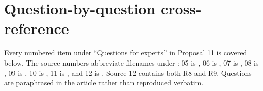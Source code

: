 \section{Question-by-question cross-reference}\label{app:crosswalk}

Every numbered item under ``Questions for experts'' in Proposal 11 is covered below. The source numbers abbreviate filenames under : 05 is , 06 is , 07 is , 08 is , 09 is , 10 is , 11 is , and 12 is . Source 12 contains both R8 and R9. Questions are paraphrased in the article rather than reproduced verbatim.\cite{proposal}

